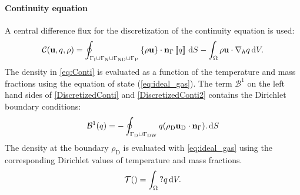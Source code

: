 \paragraph{Continuity equation}
A central difference flux for the discretization of the continuity equation is used:
\begin{equation}
	\mathcal{C}(\textbf{u},q, \rho)  =  \oint_{\Gamma_{\text{I}} \cup\Gamma_{\text{N}}\cup \Gamma_{\text{ND}}\cup \Gamma_{\text{P}}}{\left\{{\rho\textbf{u} }\right\}\cdot \textbf{n}_\Gamma\left[\!\left[{{q}}\right]\!\right] \,\mathrm{d} S} - \int_{\Omega}{\rho \textbf{u}\cdot \nabla_h q} \,\mathrm{d} V.  \label{eq:Conti}
\end{equation}
The density in \cref{eq:Conti} is evaluated as a function of the temperature and mass fractions using the equation of state (\cref{eq:ideal_gas}). The term $\mathcal{B}^1$ on the left hand sides of \cref{DiscretizedConti} and \cref{DiscretizedConti2}  contains the Dirichlet boundary conditions:
\begin{equation}
	\mathcal{B}^1(q) =  -\oint_{\Gamma_{\text{D}}\cup \Gamma_{\text{DW}}}{q(\rho_{\text{D}} \textbf{u}_{\text{D}} \cdot \textbf{n}_{\Gamma}). \,\mathrm{d} S}
\end{equation}
The density at the boundary  $\rho_{\text{D}}$ is evaluated with \cref{eq:ideal_gas} using the corresponding Dirichlet values of temperature and mass fractions.
\begin{equation}
\mathcal{T}() =   \int_{\Omega}{  ? q} \,\mathrm{d} V.
\end{equation}
